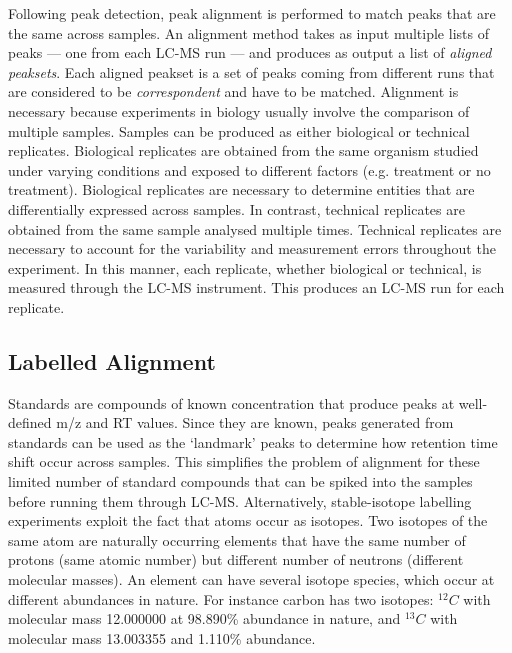 Following peak detection, peak alignment is performed to match peaks that are the same across samples. An alignment method takes as input multiple lists of peaks --- one from each LC-MS run --- and produces as output a list of \emph{aligned peaksets}. Each aligned peakset is a set of peaks coming from different runs that are considered to be \emph{correspondent} and have to be matched. Alignment is necessary because experiments in biology usually involve the comparison of multiple samples. Samples can be produced as either biological or technical replicates. Biological replicates are obtained from the same organism studied under varying conditions and exposed to different factors (e.g. treatment or no treatment). Biological replicates are necessary to determine entities that are differentially expressed across samples. In contrast, technical replicates are obtained from the same sample analysed multiple times. Technical replicates are necessary to account for the variability and measurement errors throughout the experiment. In this manner, each replicate, whether biological or technical, is measured through the LC-MS instrument. This produces an LC-MS run for each replicate.

\subsection{Labelled Alignment}

Standards are compounds of known concentration that produce peaks at well-defined m/z and RT values. Since they are known, peaks generated from standards can be used as the `landmark' peaks to determine how retention time shift occur across samples. This simplifies the problem of alignment for these limited number of standard compounds that can be spiked into the samples before running them through LC-MS. Alternatively, stable-isotope labelling experiments exploit the fact that atoms occur as isotopes. Two isotopes of the same atom are naturally occurring elements that have the same number of protons (same atomic number) but different number of neutrons (different molecular masses). An element can have several isotope species, which occur at different abundances in nature. For instance carbon has two isotopes: $^{12}C$ with molecular mass 12.000000 at 98.890\% abundance in nature, and $^{13}C$ with molecular mass 13.003355 and 1.110\% abundance. 

